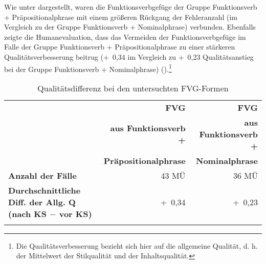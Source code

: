 















\begin{figure}
\captionsetup{width=.45\textwidth}
\begin{floatrow}
\end{floatrow}
\end{figure}


Wie unter  dargestellt, waren die Funktionsverbgefüge der Gruppe Funktionsverb + Präpositionalphrase mit einem größeren Rückgang der Fehleranzahl (im Vergleich zu der Gruppe Funktionsverb + Nominalphrase) verbunden. Ebenfalls zeigte die Humanevaluation, dass das Vermeiden der Funktionsverbgefüge im Falle der Gruppe Funktionsverb + Präpositionalphrase zu einer stärkeren Qualitätsverbesserung beitrug (+~0,34 im Vergleich zu +~0,23 Qualitätsanstieg bei der Gruppe Funktionsverb + Nominalphrase) ().\footnote{\textrm{Die Qualitätsverbesserung bezieht sich hier auf die allgemeine Qualität, d. h. der Mittelwert der Stilqualität und der Inhaltsqualität.}}


\begin{table}
\begin{tabularx}{\textwidth}{Xrr}

\lsptoprule
& { \textbf{FVG}} & \textbf{FVG}\\
& \textbf{aus Funktionsverb +} & \textbf{aus Funktionsverb +}\\
&  \textbf{Präpositionalphrase} & \textbf{Nominalphrase}\\
\midrule
\textbf{Anzahl der Fälle} & 43 MÜ & 36 MÜ\\
\tablevspace
\textbf{Durchschnittliche Diff. der Allg. Q (nach KS $-$ vor KS)} & { +~0,34} & +~0,23\\
\lspbottomrule
\end{tabularx}\caption{\label{tab:05:33} Qualitätsdifferenz bei den untersuchten FVG-Formen  }
\end{table}


